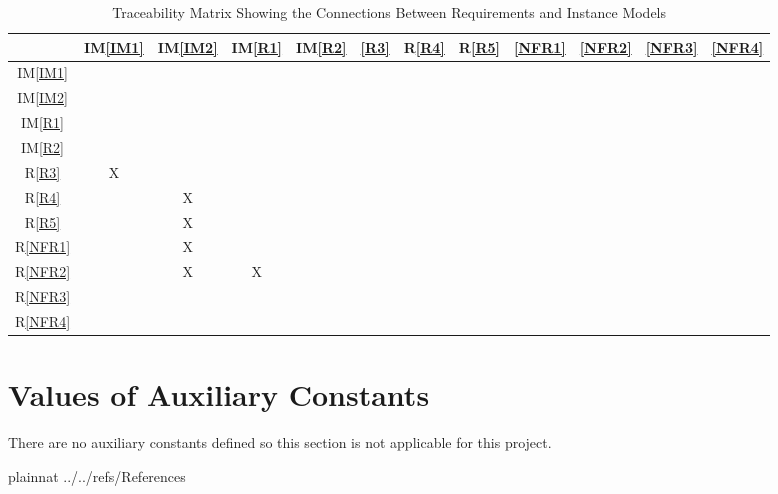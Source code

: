 \documentclass[12pt]{article}
\newcommand{\iref}[1]{IM\ref{#1}}
\newcommand{\rref}[1]{R\ref{#1}}
\begin{document}
\begin{table}[h!]
\centering
\begin{tabular}{|c|c|c|c|c|c|c|c|c|c|c|c|}
\hline
	& \iref{IM1}& \iref{IM2}& \iref{R1}& \iref{R2}& \ref{R3}& \rref{R4}& \rref{R5} & \ref{NFR1} & \ref{NFR2} & \ref{NFR3} & \ref{NFR4} \\
\hline
\iref{IM1}    & & & & & & & & & & &  \\ \hline
\iref{IM2}    & & & & & & & & & & &  \\ \hline
\iref{R1}     & & & & & & & & & & & \\ \hline
\iref{R2}     & & & & & & & & & & & \\ \hline
\rref{R3}     & X & & & & & & & & & &\\ \hline
\rref{R4}     & & X & & & & & & & & &\\ \hline
\rref{R5}     & & X & & & & & & & & &\\ \hline
\rref{NFR1}   & & X & & & & & & & & & \\ \hline
\rref{NFR2}   & & X & X & & & & & & & &\\ \hline 
\rref{NFR3}   & & & & & & & & & & &\\ \hline
\rref{NFR4}   & & & & & & & & & & &\\ 
\hline
\end{tabular}
\caption{Traceability Matrix Showing the Connections Between Requirements and Instance Models}
\label{Table:R_trace}
\end{table}

\section{Values of Auxiliary Constants}
There are no auxiliary constants defined so this section is not applicable for this project.

\newpage

 {plainnat}
 {../../refs/References}

\newpage

\noindent {}
\end{document}
